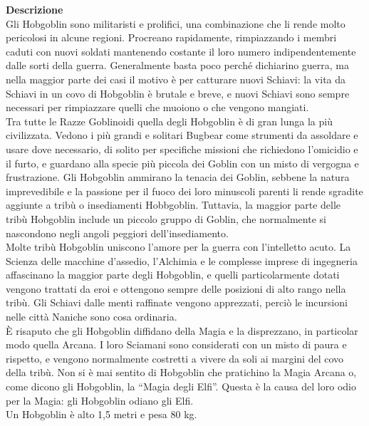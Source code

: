 \begin{multicols}{2}
\textbf{Descrizione}\\
Gli Hobgoblin sono militaristi e prolifici, una combinazione che li rende molto pericolosi in alcune regioni. Procreano rapidamente, rimpiazzando i membri caduti con nuovi soldati mantenendo costante il loro numero indipendentemente dalle sorti della guerra. Generalmente basta poco perché dichiarino guerra, ma nella maggior parte dei casi il motivo è per catturare nuovi Schiavi: la vita da Schiavi in un covo di Hobgoblin è brutale e breve, e nuovi Schiavi sono sempre necessari per rimpiazzare quelli che muoiono o che vengono mangiati.\\
Tra tutte le Razze Goblinoidi quella degli Hobgoblin è di gran lunga la più civilizzata.
Vedono i più grandi e solitari Bugbear come strumenti da assoldare e usare dove necessario, di solito per specifiche missioni che richiedono l'omicidio e il furto, e guardano alla specie più piccola dei Goblin con un misto di vergogna e frustrazione. Gli Hobgoblin ammirano la tenacia dei Goblin, sebbene la natura imprevedibile e la passione per il fuoco dei loro minuscoli parenti li rende sgradite aggiunte a tribù o insediamenti Hobbgoblin. Tuttavia, la maggior parte delle tribù Hobgoblin include un piccolo gruppo di Goblin, che normalmente si nascondono negli angoli peggiori dell'insediamento.\\
Molte tribù Hobgoblin uniscono l'amore per la guerra con l'intelletto acuto. La Scienza delle macchine d'assedio, l'Alchimia e le complesse imprese di ingegneria affascinano la maggior parte degli Hobgoblin, e quelli particolarmente dotati vengono trattati da eroi e ottengono sempre delle posizioni di alto rango nella tribù. Gli Schiavi dalle menti raffinate vengono apprezzati, perciò le incursioni nelle città Naniche sono cosa ordinaria.\\
È risaputo che gli Hobgoblin diffidano della Magia e la disprezzano, in particolar modo quella Arcana. I loro Sciamani sono considerati con un misto di paura e rispetto, e vengono normalmente costretti a vivere da soli ai margini del covo della tribù. Non si è mai sentito di Hobgoblin che pratichino la Magia Arcana o, come dicono gli Hobgoblin, la “Magia degli Elfi”. Questa è la causa del loro odio per la Magia: gli Hobgoblin odiano gli Elfi.\\
Un Hobgoblin è alto 1,5 metri e pesa 80 kg.\\



\end{multicols}
